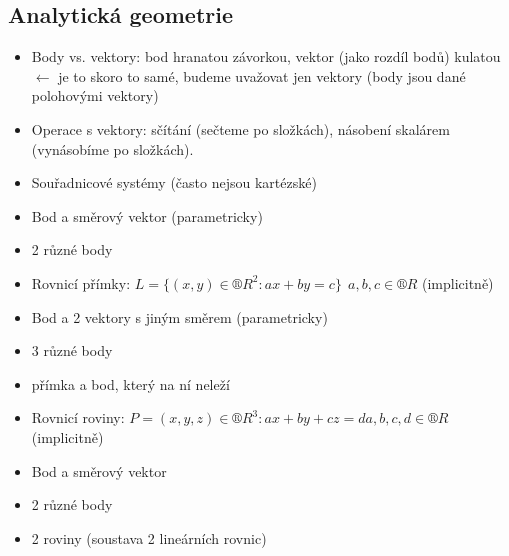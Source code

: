 \documentclass[12pt]{article}					%
\begin{document}
    \subsection{Analytická geometrie}
        \begin{poznamka}[Názvosloví]
            \begin{itemize}
                \item Body vs. vektory: bod hranatou závorkou, vektor (jako rozdíl bodů) kulatou $\leftarrow$ je to skoro to samé, budeme uvažovat jen vektory (body jsou dané polohovými vektory)
                \item Operace s vektory: sčítání (sečteme po složkách), násobení skalárem (vynásobíme po složkách).
                \item Souřadnicové systémy (často nejsou kartézské)
            \end{itemize}
        \end{poznamka}

        \begin{poznamka}
            \begin{itemize}
                \item Bod a směrový vektor (parametricky)
                \item 2 různé body
                \item Rovnicí přímky: $L = \{(x, y)\in ®R^2: ax + by = c\}\ \ a, b, c \in ®R$ (implicitně)
            \end{itemize}
        \end{poznamka}

        \begin{poznamka}
            \begin{itemize}
                \item Bod a 2 vektory s jiným směrem (parametricky)
                \item 3 různé body
                \item přímka a bod, který na ní neleží
                \item Rovnicí roviny: $P = {(x, y, z)\in ®R^3: ax + by + cz = d}  a, b, c, d \in ®R$  (implicitně)
            \end{itemize}
        \end{poznamka}

        \begin{poznamka}
            \begin{itemize}
                \item Bod a směrový vektor
                \item 2 různé body
                \item 2 roviny (soustava 2 lineárních rovnic)
            \end{itemize}
        \end{poznamka}
\end{document}
